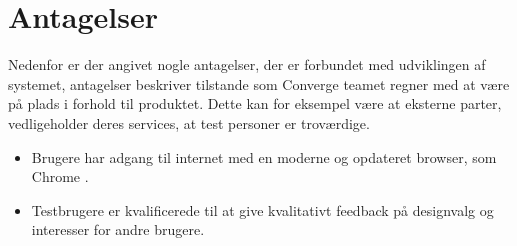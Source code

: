 \section{Antagelser}
Nedenfor er der angivet nogle antagelser, der er forbundet med udviklingen af systemet, antagelser beskriver tilstande som Converge teamet regner med at være på plads i forhold til produktet. Dette kan for eksempel være at eksterne parter, vedligeholder deres services, at test personer er troværdige.

\begin{itemize}
    \item Brugere har adgang til internet med en moderne og opdateret browser, som Chrome .
    \item Testbrugere er kvalificerede til at give kvalitativt feedback på designvalg og interesser for andre brugere.
\end{itemize}



